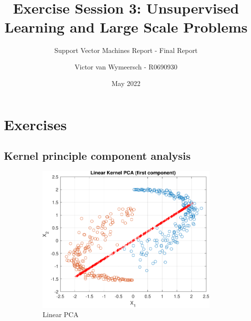 \documentclass{article}
\title{Exercise Session 3: Unsupervised Learning and Large Scale Problems}
\subtitle{\Large{Support Vector Machines Report - Final Report}}
\author{Victor van Wymeersch - R0690930}
\date{May 2022}
\begin{document}
\maketitle
    
\section{Exercises}
    \subsection{Kernel principle component analysis} 
        \begin{figure}[h]
             \centering
             \hspace{0.05\textwidth}
             \begin{subfigure}[b]{0.4\textwidth}
                 \includegraphics[width=\textwidth]{Assignment 3/figures/1_1/linear_kpca.pdf}
                 \caption{Linear PCA}
                 \label{fig:linear_pca}
             \end{subfigure}
             \hfill
             \begin{subfigure}[b]{0.4\textwidth}

\end{subfigure}
\end{figure}
\end{document}
